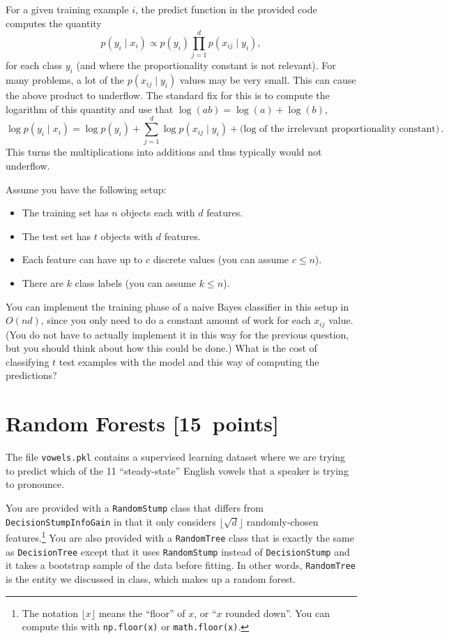 \documentclass{article}
\newcommand{\blu}[1]{{\textcolor{blu}{#1}}}
\let\ask\blu
\newcommand\pts[1]{\textcolor{pointscolour}{[#1~points]}}
\begin{document}
    For a given training example $i$, the predict function in the provided code computes the quantity
    \[
    p(y_i \mid x_i) \propto p(y_i)\prod_{j=1}^d p(x_{ij} \mid y_i),
    \]
    for each class $y_i$ (and where the proportionality constant is not relevant). For many problems, a lot of the $p(x_{ij} \mid y_i)$ values may be very small. This can cause the above product to underflow. The standard fix for this is to compute the logarithm of this quantity and use that $\log(ab) = \log(a)+\log(b)$,
    \[
    \log p(y_i \mid x_i) = \log p(y_i) + \sum_{j=1}^d \log p(x_{ij} \mid y_i) + \text{(log of the irrelevant proportionality constant)} \, .
    \]
    This turns the multiplications into additions and thus typically would not underflow.

    Assume you have the following setup:
    \begin{itemize}
        \item The training set has $n$ objects each with $d$ features.
        \item The test set has $t$ objects with $d$ features.
        \item Each feature can have up to $c$ discrete values (you can assume $c \leq n$).
        \item There are $k$ class labels (you can assume $k \leq n$).
    \end{itemize}
    You can implement the training phase of a naive Bayes classifier in this setup in $O(nd)$, since you only need to do a constant amount of work for each $x_{ij}$ value. (You do not have to actually implement it in this way for the previous question, but you should think about how this could be done.)
    \ask{What is the cost of classifying $t$ test examples with the model and this way of computing the predictions?}


    \clearpage
    \section{Random Forests \pts{15}}

    The file \texttt{vowels.pkl} contains a supervised learning dataset where we are trying to predict which of the 11 ``steady-state'' English vowels that a speaker is trying to pronounce.

    You are provided with a \texttt{RandomStump} class that differs from
    \texttt{DecisionStumpInfoGain} in that
    it only considers $\lfloor \sqrt{d} \rfloor$ randomly-chosen features.\footnote{The notation $\lfloor x\rfloor$ means the ``floor'' of $x$, or ``$x$ rounded down''. You can compute this with \texttt{np.floor(x)} or \texttt{math.floor(x)}.}
    You are also provided with a \texttt{RandomTree} class that is exactly the same as
    \texttt{DecisionTree} except that it uses \texttt{RandomStump} instead of
    \texttt{DecisionStump} and it takes a bootstrap sample of the data before fitting.
    In other words, \texttt{RandomTree} is the entity we discussed in class, which
    makes up a random forest.
\end{document}
